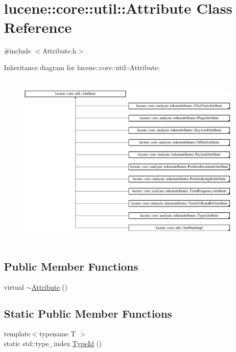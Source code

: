 \hypertarget{classlucene_1_1core_1_1util_1_1Attribute}{}\section{lucene\+:\+:core\+:\+:util\+:\+:Attribute Class Reference}
\label{classlucene_1_1core_1_1util_1_1Attribute}


{\ttfamily \#include $<$Attribute.\+h$>$}

Inheritance diagram for lucene\+:\+:core\+:\+:util\+:\+:Attribute\+:\begin{figure}[H]
\begin{center}
\leavevmode
\includegraphics[height=8.818898cm]{classlucene_1_1core_1_1util_1_1Attribute}
\end{center}
\end{figure}
\subsection*{Public Member Functions}
\begin{DoxyCompactItemize}
\item 
virtual \mbox{\hyperlink{classlucene_1_1core_1_1util_1_1Attribute_aad48274d053d0ec9afd948fea76f7ce9}{$\sim$\+Attribute}} ()
\end{DoxyCompactItemize}
\subsection*{Static Public Member Functions}
\begin{DoxyCompactItemize}
\item 
{\footnotesize template$<$typename T $>$ }\\static std\+::type\+\_\+index \mbox{\hyperlink{classlucene_1_1core_1_1util_1_1Attribute_a2093d08d843c5a937fff2f3fbdb4341c}{Type\+Id}} ()
\end{DoxyCompactItemize}


